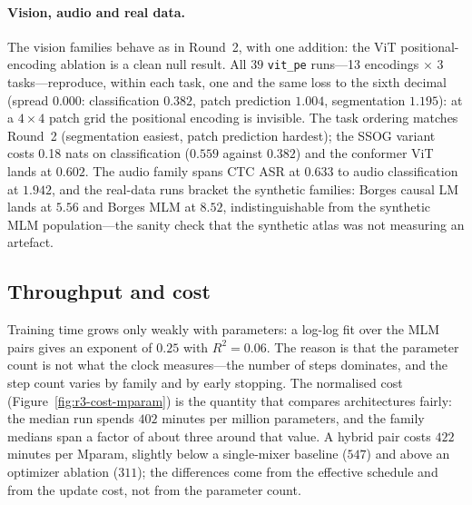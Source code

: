 \paragraph{Vision, audio and real data.}
The vision families behave as in Round~2, with one addition: the ViT positional-encoding ablation is a clean null result. All $39$ \texttt{vit\_pe} runs---13 encodings $\times$ 3 tasks---reproduce, within each task, one and the same loss to the sixth decimal (spread $0.000$: classification $0.382$, patch prediction $1.004$, segmentation $1.195$): at a $4\times4$ patch grid the positional encoding is invisible. The task ordering matches Round~2 (segmentation easiest, patch prediction hardest); the SSOG variant costs 0.18 nats on classification ($0.559$ against $0.382$) and the conformer ViT lands at $0.602$. The audio family spans CTC ASR at $0.633$ to audio classification at $1.942$, and the real-data runs bracket the synthetic families: Borges causal LM lands at $5.56$ and Borges MLM at $8.52$, indistinguishable from the synthetic MLM population---the sanity check that the synthetic atlas was not measuring an artefact.

\subsection{Throughput and cost}

Training time grows only weakly with parameters: a log-log fit over the MLM pairs gives an exponent of $0.25$ with $R^2=0.06$. The reason is that the parameter count is not what the clock measures---the number of steps dominates, and the step count varies by family and by early stopping. The normalised cost (Figure~\ref{fig:r3-cost-mparam}) is the quantity that compares architectures fairly: the median run spends $402$ minutes per million parameters, and the family medians span a factor of about three around that value. A hybrid pair costs $422$ minutes per Mparam, slightly below a single-mixer baseline ($547$) and above an optimizer ablation ($311$); the differences come from the effective schedule and from the update cost, not from the parameter count.

